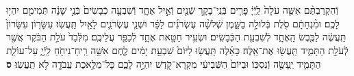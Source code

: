 \documentclass[twoside, openany, parskip=half, 11pt]{book}
\begin{document}
\begin{footnotesize}
\begin{multicols}{2}
\\
\\
וְֿהִקְרַבְתֶּ֨ם אִשֶּׁ֤ה עֹלָה֙ לַֽיְֿיָ֔ פָּרִ֧ים בְּֿנֵֽי־בָקָ֛ר שְֿׁנַ֖יִם וְֿאַ֣יִל אֶחָ֑ד וְֿשִׁבְעָ֤ה כְֿבָשִׂים֙ בְּֿנֵ֣י שָׁנָ֔ה תְּֿמִימִ֖ם יִהְי֥וּ לָכֶֽם׃ וּמִ֨נְחָתָ֔ם סֹ֖לֶת בְּֿלוּלָ֣ה בַשָּׁ֑מֶן שְֿׁלֹשָׁ֨ה עֶשְׂרֹנִ֜ים לַפָּ֗ר וּשְׁנֵ֧י עֶשְׂרֹנִ֛ים לָאַ֖יִל תַּֽעֲשֽׂוּ׃ עִשָּׂר֤וֹן עִשָּׂרוֹן֙ תַּֽעֲשֶׂ֔ה לַכֶּ֖בֶשׂ הָֽאֶחָ֑ד לְֿשִׁבְעַ֖ת הַכְּֿבָשִֽׂים׃ וּשְׂעִ֥יר חַטָּ֖את אֶחָ֑ד לְֿכַפֵּ֖ר עֲלֵיכֶֽם׃ מִלְּֿבַד֙ עֹלַ֣ת הַבֹּ֔קֶר אֲשֶׁ֖ר לְֿעֹלַ֣ת הַתָּמִ֑יד תַּֽעֲשׂ֖וּ אֶת־אֵֽלֶּה׃ כָּאֵ֜לֶּה תַּֽעֲשׂ֤וּ לַיּוֹם֙ שִׁבְעַ֣ת יָמִ֔ים לֶ֛חֶם אִשֵּׁ֥ה רֵֽיחַ־נִיחֹ֖חַ לַֽיְֿיָ֑ עַל־עוֹלַ֧ת הַתָּמִ֛יד יֵֽעָשֶׂ֖ה וְֿנִסְכּֽוֹ׃ וּבַיּוֹם֙ הַשְּֿׁבִיעִ֔י מִקְרָא־קֹ֖דֶשׁ יִהְיֶ֣ה לָכֶ֑ם כׇּל־מְלֶ֥אכֶת עֲבֹדָ֖ה לֹ֥א תַֽעֲשֽׂוּ׃ \textbf{ס}


\end{multicols}
\end{footnotesize}
\end{document}
